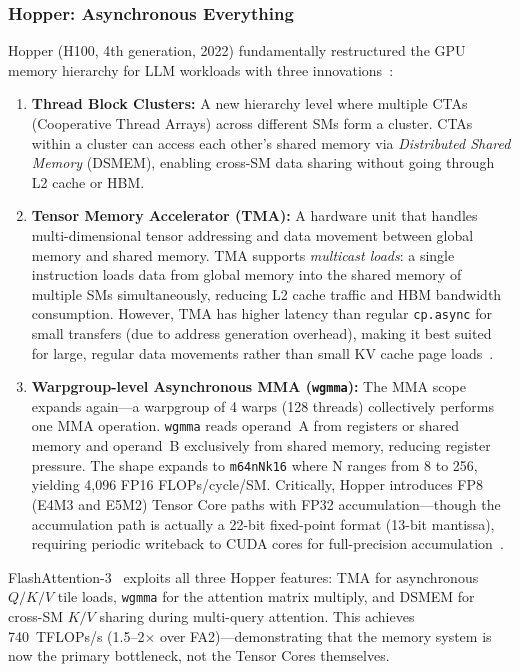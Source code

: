 \documentclass[11pt,letterpaper]{article}
\theoremstyle{definition}
\begin{document}
\subsubsection{Hopper: Asynchronous Everything}

Hopper (H100, 4th generation, 2022) fundamentally restructured the GPU memory hierarchy for LLM workloads with three innovations~\cite{patel2025tensorcore}:

\begin{enumerate}
    \item \textbf{Thread Block Clusters:} A new hierarchy level where multiple CTAs (Cooperative Thread Arrays) across different SMs form a cluster. CTAs within a cluster can access each other's shared memory via \emph{Distributed Shared Memory} (DSMEM), enabling cross-SM data sharing without going through L2 cache or HBM.

    \item \textbf{Tensor Memory Accelerator (TMA):} A hardware unit that handles multi-dimensional tensor addressing and data movement between global memory and shared memory. TMA supports \emph{multicast loads}: a single instruction loads data from global memory into the shared memory of multiple SMs simultaneously, reducing L2 cache traffic and HBM bandwidth consumption. However, TMA has higher latency than regular \texttt{cp.async} for small transfers (due to address generation overhead), making it best suited for large, regular data movements rather than small KV cache page loads~\cite{patel2025tensorcore}.

    \item \textbf{Warpgroup-level Asynchronous MMA (\texttt{wgmma}):} The MMA scope expands again---a warpgroup of 4 warps (128 threads) collectively performs one MMA operation. \texttt{wgmma} reads operand~A from registers or shared memory and operand~B exclusively from shared memory, reducing register pressure. The shape expands to \texttt{m64nNk16} where N ranges from 8 to 256, yielding 4,096 FP16 FLOPs/cycle/SM. Critically, Hopper introduces FP8 (E4M3 and E5M2) Tensor Core paths with FP32 accumulation---though the accumulation path is actually a 22-bit fixed-point format (13-bit mantissa), requiring periodic writeback to CUDA cores for full-precision accumulation~\cite{patel2025tensorcore}.
\end{enumerate}

FlashAttention-3~\cite{shah2024flashattention3} exploits all three Hopper features: TMA for asynchronous $Q/K/V$ tile loads, \texttt{wgmma} for the attention matrix multiply, and DSMEM for cross-SM $K/V$ sharing during multi-query attention. This achieves 740~TFLOPs/s (1.5--2$\times$ over FA2)---demonstrating that the memory system is now the primary bottleneck, not the Tensor Cores themselves.
\end{document}

